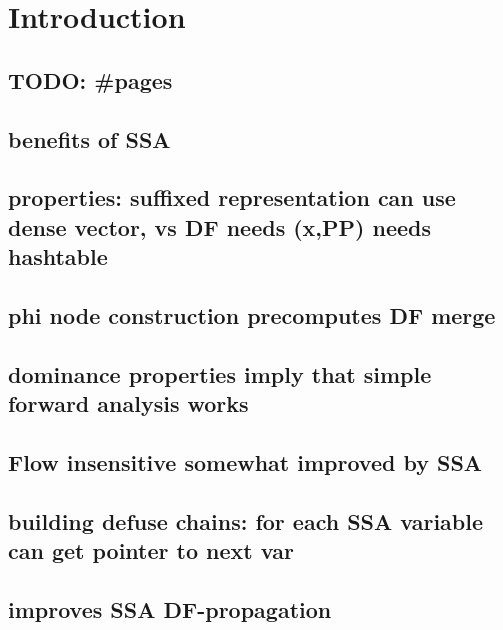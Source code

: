 \applynumberofpages\chapter{Introduction }
\section{TODO: \#pages}

\section{benefits of SSA}

\section{properties: suffixed representation can use dense vector, vs DF needs (x,PP) needs hashtable}
\section{phi node construction precomputes DF merge}
\section{dominance properties imply that simple forward analysis works}
\section{Flow insensitive somewhat improved by SSA}
\section{building defuse chains: for each SSA variable can get pointer to next var}
\section{improves SSA DF-propagation}


